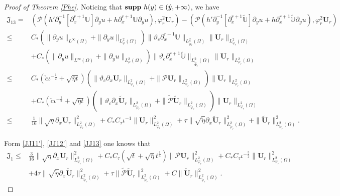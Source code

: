 \documentclass[10pt,a4paper]{amsart}
\begin{document}
\begin{proof}[Proof of Theorem \ref{Phe}]
Noticing that ${\bf supp}~h(y)\in(\hat{y},+\infty)$, we have
\begin{align}\label{JJ13}
\mathfrak{J}_{13}
=&(\mathcal{P}(h'\partial_{y}^{-1}[\partial_{x}^{r+1}\mathbb{U}]\partial_{y}u+h\partial_{x}^{r+1}\mathbb{U}\partial_{y}u),\varphi_{r}^{2}\mathbf{U}_{r})
 -(\mathcal{P}(h'\partial_{y}^{-1}[\partial_{x}^{r+1}\tilde{\mathbb{U}}]\partial_{y}u+h\partial_{x}^{r+1}\tilde{\mathbb{U}}\partial_{y}u),\varphi_{r}^{2}\mathbf{U}_{r})\\
\leq& C_{*}\left(\|\partial_{y}u\|_{L^{\infty}(\Omega)}+\|\partial_{y}u\|_{L_{\varphi}^{2}(\Omega)}\right)
           \|\vartheta_{c}\partial_{x}^{r+1}\mathbb{U}\|_{L_{\hat{\Psi}_{r}}^{2}(\Omega)}\|\mathbf{U}_{r}\|_{L_{\varphi_{r}}^{2}(\Omega)}\nonumber\\
    &+C_{*}\left(\|\partial_{y}u\|_{L^{\infty}(\Omega)}+\|\partial_{y}u\|_{L_{\varphi}^{2}(\Omega)}\right)
           \|\vartheta_{c}\partial_{x}^{r+1}\tilde{\mathbb{U}}\|_{L_{\tilde{\hat{\Psi}}_{r}}^{2}(\Omega)}\|\mathbf{U}_{r}\|_{L_{\varphi_{r}}^{2}(\Omega)}\nonumber\\
\leq& C_{*}(\check{c}\iota^{-\frac{1}{2}}+\sqrt{\bar{\eta}t})
           \left(\|\vartheta_{c}\partial_{x}\mathbf{U}_{r}\|_{L_{\varphi_{r}}^{2}(\Omega)}+\|\mathcal{P}\mathbf{U}_{r}\|_{L_{\varphi_{r}}^{2}(\Omega)}\right)
           \|\mathbf{U}_{r}\|_{L_{\varphi_{r}}^{2}(\Omega)}\nonumber\\
    &+C_{*}(\check{c}\iota^{-\frac{1}{2}}+\sqrt{\bar{\eta}t})
           \left(\|\vartheta_{c}\partial_{x}\tilde{\mathbf{U}}_{r}\|_{L_{\tilde{\varphi}_{r}}^{2}(\Omega)}+\|\tilde{\mathcal{P}}\tilde{\mathbf{U}}_{r}\|_{L_{\tilde{\varphi}_{r}}^{2}(\Omega)}\right)
           \|\mathbf{U}_{r}\|_{L_{\varphi_{r}}^{2}(\Omega)}\nonumber\\
\leq& \frac{1}{16}\|\sqrt{\eta}\partial_{x}\mathbf{U}_{r}\|_{L_{\varphi_{r}}^{2}(\Omega)}^{2}
     +C_{*}C_{\tau}\iota^{-1}\|\mathbf{U}_{r}\|_{L_{\varphi_{r}}^{2}(\Omega)}^{2}
     +\tau\|\sqrt{\tilde{\eta}}\partial_{x}\tilde{\mathbf{U}}_{r}\|_{L_{\tilde{\varphi}_{r}}^{2}(\Omega)}^{2}
     +\|\tilde{\mathbf{U}}_{r}\|_{L_{\tilde{\varphi}_{r}}^{2}(\Omega)}^{2}.\nonumber
\end{align}

Form \eqref{JJ11'}, \eqref{JJ12'} and \eqref{JJ13} one knows that
\begin{align}\label{JJ1}
\mathfrak{J}_{1}
\leq& \frac{3}{16}\|\sqrt{\eta}\partial_{x}\mathbf{U}_{r}\|_{L_{\varphi_{r}}^{2}(\Omega)}^{2}
     +C_{*}C_{\tau}(\sqrt{t}+\sqrt{\bar{\eta}}t^{\frac{1}{4}})\|\mathcal{P}\mathbf{U}_{r}\|_{L_{\varphi_{r}}^{2}(\Omega)}^{2}
     +C_{*}C_{\tau}\iota^{-\frac{5}{2}}\|\mathbf{U}_{r}\|_{L_{\varphi_{r}}^{2}(\Omega)}^{2}\\
    &+4\tau\|\sqrt{\tilde{\eta}}\partial_{x}\tilde{\mathbf{U}}_{r}\|_{L_{\tilde{\varphi}_{r}}^{2}(\Omega)}^{2}
     +\tau\|\tilde{\mathcal{P}}\tilde{\mathbf{U}}_{r}\|_{L_{\tilde{\varphi}_{r}}^{2}(\Omega)}^{2}
     +C\|\tilde{\mathbf{U}}_{r}\|_{L_{\tilde{\varphi}_{r}}^{2}(\Omega)}^{2}.\nonumber
\end{align}


\end{proof}
\end{document}
